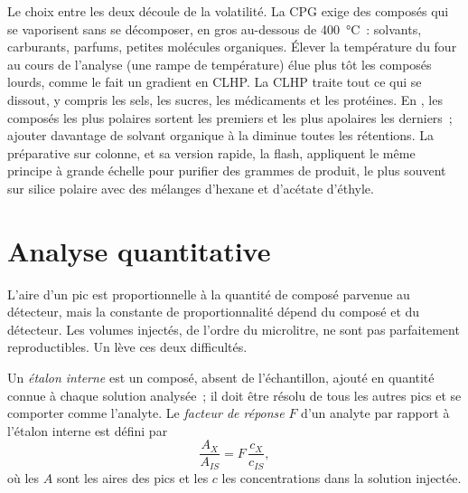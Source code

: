 Le choix entre les deux découle de la volatilité. La CPG exige des composés qui se vaporisent sans se
décomposer, en gros au-dessous de \qty{400}{\degreeCelsius}~: solvants, carburants, parfums, petites
molécules organiques. Élever la température du four au cours de l'analyse (une rampe de température)
élue plus tôt les composés lourds, comme le fait un gradient en CLHP. La CLHP traite tout ce qui se
dissout, y compris les sels, les sucres, les médicaments et les protéines. En , les composés
les plus polaires sortent les premiers et les plus apolaires les derniers~; ajouter davantage de solvant
organique à la  diminue toutes les rétentions. La  préparative sur colonne, et
sa version rapide, la  flash, appliquent le même principe à grande échelle pour purifier
des grammes de produit, le plus souvent sur silice polaire avec des mélanges d'hexane et d'acétate d'éthyle.

\section{Analyse quantitative}

L'aire d'un pic est proportionnelle à la quantité de composé parvenue au détecteur, mais la constante
de proportionnalité dépend du composé et du détecteur. Les volumes injectés, de l'ordre du microlitre, ne
sont pas parfaitement reproductibles. Un  lève ces deux difficultés.

\begin{definition}\label{def:b2:chromatography:quantitative}
Un \emph{étalon interne} est un composé, absent de l'échantillon,
ajouté en quantité connue à chaque solution analysée~; il doit être résolu de tous les autres pics et se
comporter comme l'analyte. Le \emph{facteur de réponse} $F$
d'un analyte par rapport à l'étalon interne est défini par
\begin{equation*}
\frac{A_X}{A_{IS}} = F\,\frac{c_X}{c_{IS}},
\end{equation*}
où les $A$ sont les aires des pics et les $c$ les concentrations dans la solution injectée.
\end{definition}

